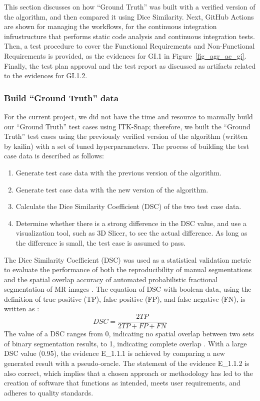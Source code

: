 This section discusses on how ``Ground Truth'' was built with a verified version of the algorithm, and then compared it using Dice Similarity. Next, GitHub Actions are shown for managing the workflows, for the continuous integration infrustructure that performs static code analysis and continuous integration tests. Then, a test procedure to cover the Functional Requirements and Non-Functional Requirements is provided, as the evidences for GI.1 in Figure~\ref{fig_agr_ac_gi}. Finally, the test plan approval and the test report as discussed as artifacts related to the evidences for GI.1.2.

\subsubsection{Build ``Ground Truth'' data}
For the current project, we did not have the time and resource to manually build our ``Ground Truth'' test cases using ITK-Snap; therefore, we built the ``Ground Truth'' test cases using the previously verified version of the algorithm (written by kailin) with a set of tuned hyperparameters. The process of building the test case data is described as follows:

\begin{enumerate}
  \item Generate test case data with the previous version of the algorithm.
  \item Generate test case data with the new version of the algorithm.
  \item Calculate the Dice Similarity Coefficient (DSC) of the two test case data.
  \item Determine whether there is a strong difference in the DSC value, and use a visualization tool, such as 3D Slicer, to see the actual difference. As long as the difference is small, the test case is assumed to pass.
\end{enumerate}

The Dice Similarity Coefficient (DSC) was used as a statistical validation metric to evaluate the performance of both the reproducibility of manual segmentations and the spatial overlap accuracy of automated probabilistic fractional segmentation of MR images \cite{ZOU2004178}. The equation of DSC with boolean data, using the definition of true positive (TP), false positive (FP), and false negative (FN), is written as \cite{Wikipedia_2023}:
\begin{equation}
DSC = \frac{2TP}{2TP+FP+FN}
\end{equation}
The value of a DSC ranges from 0, indicating no spatial overlap between two sets of binary segmentation results, to 1, indicating complete overlap \cite{ZOU2004178}. With a large DSC value (0.95), the evidence E\_1.1.1 is achieved by comparing a new generated result with a pseudo-oracle. The statement of the evidence E\_1.1.2 is also correct, which implies that a chosen approach or methodology has led to the creation of software that functions as intended, meets user requirements, and adheres to quality standards.

